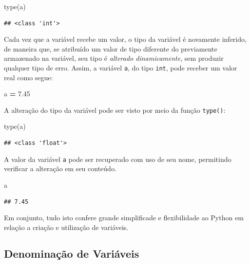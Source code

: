 \documentclass[
]{book}
\newenvironment{Shaded}{\begin{snugshade}}{\end{snugshade}}
\newcommand{\BuiltInTok}[1]{#1}
\newcommand{\FloatTok}[1]{\textcolor[rgb]{0.00,0.00,0.81}{#1}}
\newcommand{\NormalTok}[1]{#1}
\newcommand{\OperatorTok}[1]{\textcolor[rgb]{0.81,0.36,0.00}{\textbf{#1}}}
\begin{document}
\begin{Shaded}
\begin{Highlighting}[]
\BuiltInTok{type}\NormalTok{(a)}
\end{Highlighting}
\end{Shaded}

\begin{verbatim}
## <class 'int'>
\end{verbatim}

Cada vez que a variável recebe um valor, o tipo da variável é novamente inferido, de maneira que, se atribuído um valor de tipo diferente do previamente armazenado na variável, seu tipo é \emph{alterado dinamicamente}, sem produzir qualquer tipo de erro. Assim, a variável \texttt{a}, do tipo \texttt{int}, pode receber um valor real como segue:

\begin{Shaded}
\begin{Highlighting}[]
\NormalTok{a }\OperatorTok{=} \FloatTok{7.45}
\end{Highlighting}
\end{Shaded}

A alteração do tipo da variável pode ser visto por meio da função \texttt{type()}:

\begin{Shaded}
\begin{Highlighting}[]
\BuiltInTok{type}\NormalTok{(a)}
\end{Highlighting}
\end{Shaded}

\begin{verbatim}
## <class 'float'>
\end{verbatim}

A valor da variável \texttt{a} pode ser recuperado com uso de seu nome, permitindo verificar a alteração em seu conteúdo.

\begin{Shaded}
\begin{Highlighting}[]
\NormalTok{a}
\end{Highlighting}
\end{Shaded}

\begin{verbatim}
## 7.45
\end{verbatim}

Em conjunto, tudo isto confere grande simplificade e flexibilidade ao Python em relação a criação e utilização de variáveis.

\hypertarget{comput-varia-nomes}{%
\subsection{Denominação de Variáveis}\label{comput-varia-nomes}}
\end{document}
